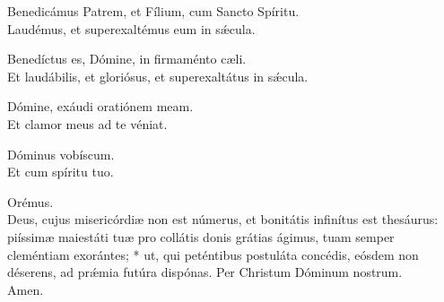 \begin{multicols}{2}
	\setlength{\parskip}{0.5em}
	\V Benedicámus Patrem, et Fílium, cum Sancto Spíritu.\\
	\R Laudémus, et superexaltémus eum in s\'{\ae}cula.

	\V Benedíctus es, Dómine, in firmaménto c\ae{}li.\\
	\R Et laudábilis, et gloriósus, et superexaltátus in s\'{\ae}cula.

	\V Dómine, exáudi oratiónem meam.\\
	\R Et clamor meus ad te véniat.

	\V Dóminus vobíscum.\\
	\R Et cum spíritu tuo.

	Orémus.\\
	Deus, cujus misericórdi\ae{} non est númerus, et bonitátis infinítus est thesáurus:
	\maltese{} piíssim\ae{} maiestáti tu\ae{} pro collátis donis grátias ágimus,
	tuam semper cleméntiam exorántes; * ut, qui peténtibus postuláta concédis,
	eósdem non déserens, ad pr\'{\ae}mia futúra dispónas.
	Per Christum Dóminum nostrum.\\
	\R Amen.
\end{multicols}
